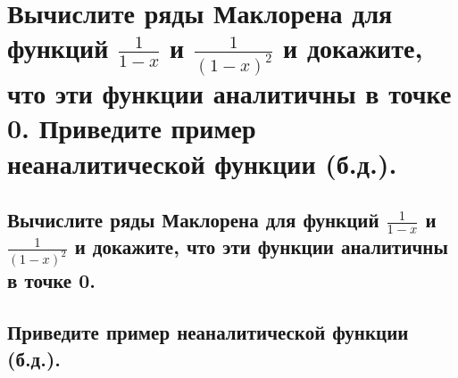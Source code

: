 \section{Вычислите ряды Маклорена для функций $\frac{1}{1-x}$ и $\frac{1}{(1-x)^2}$ и докажите, что эти функции аналитичны в точке 0. Приведите пример неаналитической функции (б.д.).}

\subsection{Вычислите ряды Маклорена для функций $\frac{1}{1-x}$ и $\frac{1}{(1-x)^2}$ и докажите, что эти функции аналитичны в точке 0.}

\subsection{Приведите пример неаналитической функции (б.д.).}